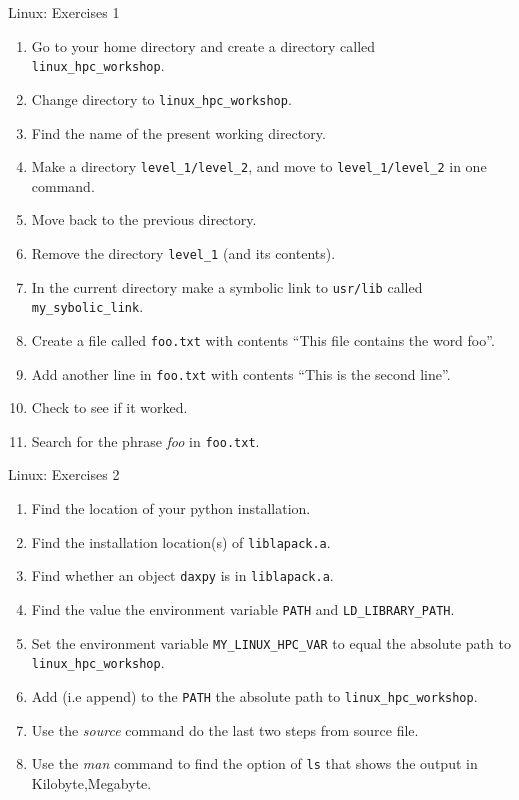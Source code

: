 \documentclass{beamer}
\begin{document}
\begin{frame}{Linux: Exercises 1}
  \fontsize{8pt}{8}\selectfont
  \begin{enumerate}
    \item Go to your home directory and create a directory called \texttt{linux\_hpc\_workshop}.
    \item Change directory to \texttt{linux\_hpc\_workshop}.
    \item Find the name of the present working directory.
    \item Make a directory \texttt{level\_1/level\_2}, and move to \texttt{level\_1/level\_2} in one command.
    \item Move back to the previous directory.
    \item Remove the directory \texttt{level\_1} (and its contents).
    \item In the current directory make a symbolic link to \texttt{usr/lib} called \texttt{my\_sybolic\_link}.
    \item Create a file called \texttt{foo.txt} with contents ``This file contains the word foo''.
    \item Add another line in \texttt{foo.txt} with contents ``This is the second line''.
    \item Check to see if it worked.
    \item Search for the phrase \emph{foo} in \texttt{foo.txt}.
  \end{enumerate}
\end{frame}


\begin{frame}{Linux: Exercises 2}
  \fontsize{8pt}{8}\selectfont
  \begin{enumerate}
    \item Find the location of your python installation.
    \item Find the installation location(s) of \texttt{liblapack.a}.
    \item Find whether an object \texttt{daxpy} is in \texttt{liblapack.a}.
    \item Find the value the environment variable \texttt{PATH} and \texttt{LD\_LIBRARY\_PATH}.
    \item Set the environment variable \texttt{MY\_LINUX\_HPC\_VAR} to equal the absolute path to \texttt{linux\_hpc\_workshop}.
    \item Add (i.e append) to the \texttt{PATH} the absolute path to \texttt{linux\_hpc\_workshop}.
    \item Use the \textit{source} command do the last two steps from source file.
    \item Use the \textit{man} command to find the option of \texttt{ls} that shows the output in Kilobyte,Megabyte.
  \end{enumerate}
\end{frame}
\end{document}
